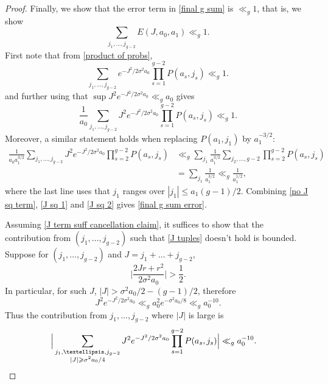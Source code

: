 \documentclass[10pt,a4paper]{amsart}
\renewcommand{\geq}{\geqslant}
\renewcommand{\leq}{\leqslant}
\begin{document}
\begin{proof}
Finally, we show that the error term in \cref{final g sum} is $\ll_{g} 1$, that is, we show
\begin{equation}\label{final g sum error}
    \sum_{j_{1},\ldots, j_{g-2}}E(J,a_{0},a_{1})\ll_{g} 1.
\end{equation}
First note that from \cref{product of probs}, 
\begin{equation}\label{no J sq term}
    \sum_{j_{1},\ldots, j_{g-2}}e^{-J^{2}/2\sigma^{2}a_{0}}\prod_{s=1}^{g-2}P(a_{s},j_{s})\ll_{g} 1.
\end{equation}
and further using that $\sup J^{2}e^{-J^{2}/2\sigma^{2}a_{0}}\ll_{g} a_{0}$ gives
\begin{equation}\label{J sq 1}
    \frac{1}{a_{0}}\sum_{j_{1},\ldots, j_{g-2}}J^{2}e^{-J^{2}/2\sigma^{2}a_{0}}\prod_{s=1}^{g-2}P(a_{s},j_{s})\ll_{g} 1.
\end{equation}
    Moreover, a similar statement holds when replacing $P(a_{1},j_{1})$ by $a_{1}^{-3/2}$:
    \begin{align}
         \frac{1}{a_{0}a_{1}^{3/2}}\sum_{j_{1},\ldots, j_{g-2}}J^{2}e^{-J^{2}/2\sigma^{2}a_{0}}\prod_{s=2}^{g-2}P(a_{s},j_{s})&\ll_{g} \sum_{j_{1}}\frac{1}{a_{1}^{3/2}}\sum_{j_{2},\ldots, g-2}\prod_{s=2}^{g-2}P(a_{s},j_{s})\nonumber\\
         &=\sum_{j_{1}}\frac{1}{a_{1}^{3/2}}\ll_{g} \frac{1}{a_{1}^{1/2}},\label{J sq 2}
    \end{align}
    where the last line uses that $j_{1}$ ranges over $|j_{1}|\leq a_{1}(g-1)/2$.
    Combining \cref{no J sq term}, \cref{J sq 1} and \cref{J sq 2} gives \cref{final g sum error}.

Assuming \cref{J term suff cancellation claim}, it suffices to show that the contribution from $(j_{1},\ldots, j_{g-2})$ such that \cref{J tuples} doesn't hold is bounded. Suppose for $(j_{1},\ldots, j_{g-2})$ and $J=j_{1}+\ldots +j_{g-2}$,
\[\Big|\frac{2Jr+r^{2}}{2\sigma^{2}a_{0}}\Big |>\frac{1}{2}.\]
In particular, for such $J$, $|J|>\sigma^{2}a_{0}/2-(g-1)/2$, therefore
\begin{equation*}
    J^{2}e^{-J^{2}/2\sigma^{2}a_{0}}\ll_{g} a_{0}^{2}e^{-\sigma^{2}a_{0}/8}\ll_{g} a_{0}^{-10}.
\end{equation*}
Thus the contribution from $j_{1},\ldots, j_{g-2}$ where $|J|$ is large is
\begin{align*}
    \Big |\sum_{\substack{j_{1},\ldots, j_{g-2}\\ |J|\geq \sigma^{2}a_{0}/4}}J^{2}e^{-J^{2}/2\sigma^{2}a_{0}}\prod_{s=1}^{g-2}P(a_{s},j_{s})\Big |&\ll_{g} a_{0}^{-10}.\qedhere
\end{align*}
\end{proof}
\end{document}
